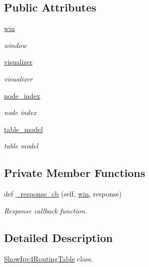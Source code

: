 \subsection*{Public Attributes}
\begin{DoxyCompactItemize}
\item 
\hyperlink{classipv4__routing__table_1_1ShowIpv4RoutingTable_aef66404f7aed5614e7b2444d7a28f010}{win}
\begin{DoxyCompactList}\small\item\em window \end{DoxyCompactList}\item 
\hyperlink{classipv4__routing__table_1_1ShowIpv4RoutingTable_aaffe658fdd5746d8db628aae110374fc}{visualizer}
\begin{DoxyCompactList}\small\item\em visualizer \end{DoxyCompactList}\item 
\hyperlink{classipv4__routing__table_1_1ShowIpv4RoutingTable_af135b23094260a6c002cc7d8bb6b479b}{node\+\_\+index}
\begin{DoxyCompactList}\small\item\em node index \end{DoxyCompactList}\item 
\hyperlink{classipv4__routing__table_1_1ShowIpv4RoutingTable_a6759a8a1af2db9f1d872b422e2d268a6}{table\+\_\+model}
\begin{DoxyCompactList}\small\item\em table model \end{DoxyCompactList}\end{DoxyCompactItemize}
\subsection*{Private Member Functions}
\begin{DoxyCompactItemize}
\item 
def \hyperlink{classipv4__routing__table_1_1ShowIpv4RoutingTable_a12e29ffa6152cb1c2723d80b38e1159c}{\+\_\+response\+\_\+cb} (self, \hyperlink{classipv4__routing__table_1_1ShowIpv4RoutingTable_aef66404f7aed5614e7b2444d7a28f010}{win}, response)
\begin{DoxyCompactList}\small\item\em Response callback function. \end{DoxyCompactList}\end{DoxyCompactItemize}


\subsection{Detailed Description}
\hyperlink{classipv4__routing__table_1_1ShowIpv4RoutingTable}{Show\+Ipv4\+Routing\+Table} class. 

